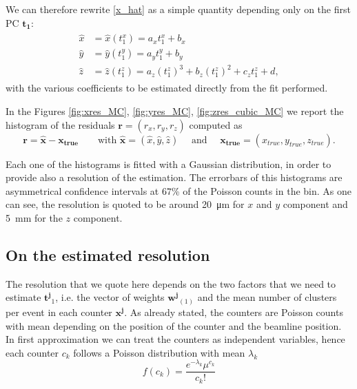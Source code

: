 We can therefore rewrite \eqref{x_hat} as a simple quantity depending only on the first PC $\mathbf{t_1}$:
\begin{align}
\begin{split}
    \hat{x} &= \hat{x}(t^x_1) = a_x t^x_1 + b_x \\
    \hat{y} &= \hat{y}(t^y_1) = a_y t^y_1 + b_y \\\label{x_hat_true}
    \hat{z} &= \hat{z}(t^z_1) = a_z (t^z_1)^3 + b_z (t^z_1)^2 + c_z  t^z_1 + d,
    \end{split}
\end{align} 
with the various coefficients to be estimated directly from the fit performed. 

In the Figures \ref{fig:xres_MC}, \ref{fig:yres_MC}, \ref{fig:zres_cubic_MC} we report the histogram of the residuals $\mathbf{r}=(r_x, r_y, r_z)$ computed as 
 \begin{equation}
     \mathbf{r}=\hat{\mathbf{x}} - \mathbf{x_{true}} \qquad \text{with } \hat{\mathbf{x}} = (\hat{x}, \hat{y}, \hat{z}) \quad \text{ and } \quad \mathbf{x_{true}}=(x_{true}, y_{true}, z_{true}).
 \end{equation}

 Each one of the histograms is fitted with a Gaussian distribution, in order to provide also a resolution of the estimation. The errorbars of this histograms are asymmetrical confidence intervals at $67$\% of the Poisson counts in the bin.
 As one can see, the resolution is quoted to be around \SI{20}{\micro\meter} for $x$ and $y$ component and \SI{5}{\milli\meter} for the $z$ component. 
 \subsection{On the estimated resolution}
 The resolution that we quote here depends on the two factors that we need to estimate $\mathbf{t^{j}}_{1}$, i.e. the vector of weights $\mathbf{w^j}_{(1)}$ and the mean number of clusters per event in each counter $\mathbf{x^{j}}$. As already stated, the counters are Poisson counts with mean depending on the position of the counter and the beamline position. In first approximation we can treat the counters as independent variables, hence each counter $c_k$ follows a Poisson distribution with mean $\lambda_k$
 \begin{equation}
     f(c_k) = \frac{e^{-\lambda_k} \mu^{c_k}}{c_k!}
 \end{equation}

